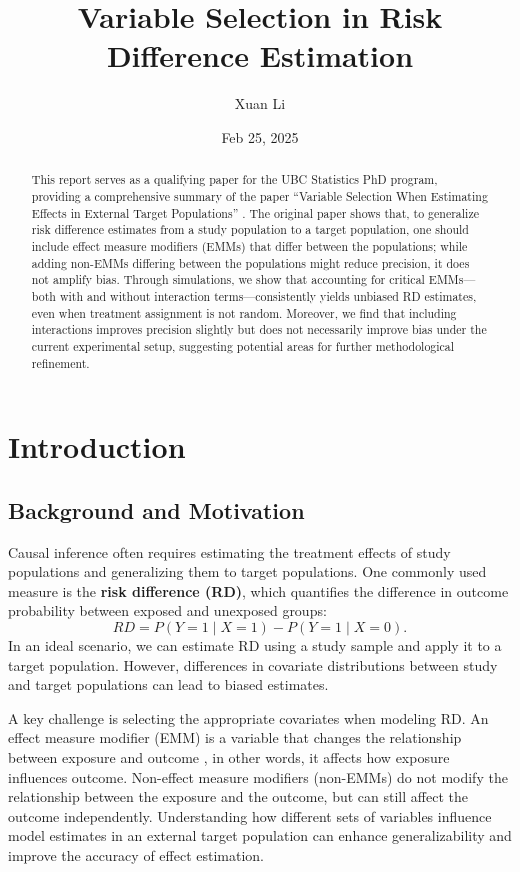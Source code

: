 \documentclass[12pt,oneside]{amsart}
\title{Variable Selection in Risk Difference Estimation}
\author{Xuan Li}
\date{Feb 25, 2025}
\theoremstyle{definition}
\theoremstyle{remark}
\numberwithin{equation}{section}
\begin{document}
\begin{abstract}
    This report serves as a qualifying paper for the UBC Statistics PhD program, providing a comprehensive summary of the paper “Variable Selection When Estimating Effects in External Target Populations” \citep{qp}. The original paper shows that, to generalize risk difference estimates from a study population to a target population, one should include effect measure modifiers (EMMs) that differ between the populations; while adding non-EMMs differing between the populations might reduce precision, it does not amplify bias. Through simulations, we show that accounting for critical EMMs—both with and without interaction terms—consistently yields unbiased RD estimates, even when treatment assignment is not random. Moreover, we find that including interactions improves precision slightly but does not necessarily improve bias under the current experimental setup, suggesting potential areas for further methodological refinement.
\end{abstract}
\maketitle
\tableofcontents



\section{Introduction}

\subsection{Background and Motivation}

Causal inference often requires estimating the treatment effects of study populations and generalizing them to target populations. One commonly used measure is the \textbf{risk difference (RD)}, which quantifies the difference in outcome probability between exposed and unexposed groups:
\begin{equation}
    RD = P(Y = 1 \mid X = 1) - P(Y = 1 \mid X = 0).
\end{equation}
In an ideal scenario, we can estimate RD using a study sample and apply it to a target population. However, differences in covariate distributions between study and target populations can lead to biased estimates.

A key challenge is selecting the appropriate covariates when modeling RD. An effect measure modifier (EMM) is a variable that changes the relationship between exposure and outcome \citep{rd}, in other words, it affects how exposure influences outcome. Non-effect measure modifiers (non-EMMs) do not modify the relationship between the exposure and the outcome, but can still affect the outcome independently. Understanding how different sets of variables influence model estimates in an external target population can enhance generalizability and improve the accuracy of effect estimation. 
\end{document}
